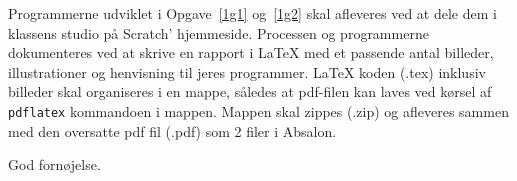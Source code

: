\documentclass[a4paper,12pt]{article}
\begin{document}
Programmerne udviklet i Opgave~\ref{1g1} og~\ref{1g2} skal afleveres ved at dele dem i klassens studio på Scratch' hjemmeside. Processen og programmerne dokumenteres ved at skrive en rapport i LaTeX med et passende antal billeder, illustrationer og henvisning til jeres programmer. LaTeX koden (.tex) inklusiv billeder skal organiseres i en mappe, således at pdf-filen kan laves ved kørsel af \verb|pdflatex| kommandoen i mappen. Mappen skal zippes (.zip) og afleveres sammen med den oversatte pdf fil (.pdf) som 2 filer i Absalon.

\flushright God fornøjelse.
\end{document}
